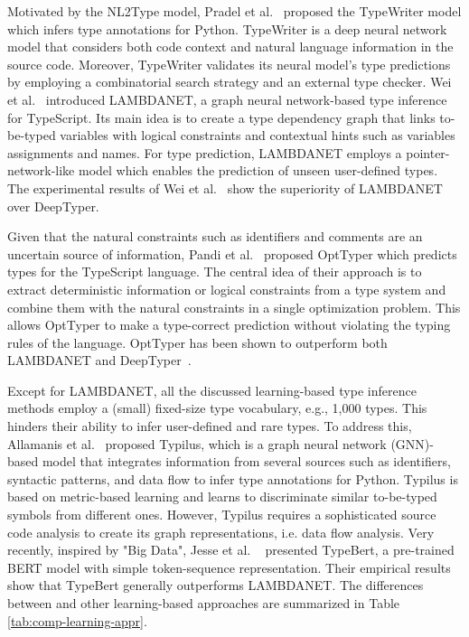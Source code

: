 Motivated by the NL2Type model, Pradel et al.~\cite{pradel2019typewriter} proposed the TypeWriter model which infers type annotations for Python. TypeWriter is a deep neural network model that considers both code context and natural language information in the source code. Moreover, TypeWriter validates its neural model's type predictions by employing a combinatorial search strategy and an external type checker. Wei et al.~\cite{wei2019lambdanet} introduced LAMBDANET, a graph neural network-based type inference for TypeScript. Its main idea is to create a type dependency graph that links to-be-typed variables with logical constraints and contextual hints such as variables assignments and names. For type prediction, LAMBDANET employs a pointer-network-like model which enables the prediction of unseen user-defined types. The experimental results of Wei et al.~\cite{wei2019lambdanet} show the superiority of LAMBDANET over DeepTyper.

Given that the natural constraints such as identifiers and comments are an uncertain source of information, Pandi et al.~\cite{pandi2020opttyper} proposed OptTyper which predicts types for the TypeScript language. The central idea of their approach is to extract deterministic information or logical constraints from a type system and combine them with the natural constraints in a single optimization problem. This allows OptTyper to make a type-correct prediction without violating the typing rules of the language. OptTyper has been shown to outperform both LAMBDANET and DeepTyper~\cite{pandi2020opttyper}.

Except for LAMBDANET, all the discussed learning-based type inference methods employ a (small) fixed-size type vocabulary, e.g., 1,000 types. This hinders their ability to infer user-defined and rare types. To address this, Allamanis et al.~\cite{allamanis2020typilus} proposed Typilus, which is a graph neural network (GNN)-based model that integrates information from several sources such as identifiers, syntactic patterns, and data flow to infer type annotations for Python. Typilus is based on metric-based learning and learns to discriminate similar to-be-typed symbols from different ones. However, Typilus requires a sophisticated source code analysis to create its graph representations, i.e. data flow analysis. Very recently, inspired by "Big Data", Jesse et al. ~\cite{jesse2021learning} presented TypeBert, a pre-trained BERT model with simple token-sequence representation. Their empirical results show that TypeBert generally outperforms LAMBDANET. The differences between \name and other learning-based approaches are summarized in Table \ref{tab:comp-learning-appr}.

